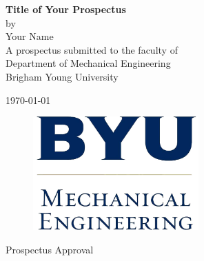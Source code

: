 \documentclass[12pt, letterpaper]{article}
\begin{document}
\begin{titlepage}

\begin{center}

\vspace*{\fill}

\vspace{0.5in}

{ \LARGE \bfseries Title of Your Prospectus}\\[.25in]

\large
by\\[.25 in]
Your Name\\[1in]

A prospectus submitted to the faculty of\\
Department of Mechanical Engineering\\
Brigham Young University

\vspace{1in}

\today

\vspace*{\fill}

\end{center}

\end{titlepage}

\thispagestyle{empty}

\begin{center}
\vspace*{\fill}

\begin{figure}[htbp] %
   \centering
   \includegraphics[width=2.5in]{byume_logo_clear.jpg} 
\end{figure}

\vspace{0.5in}

\Large{Prospectus Approval}\\[0.5in]

\end{center}
\end{document}
